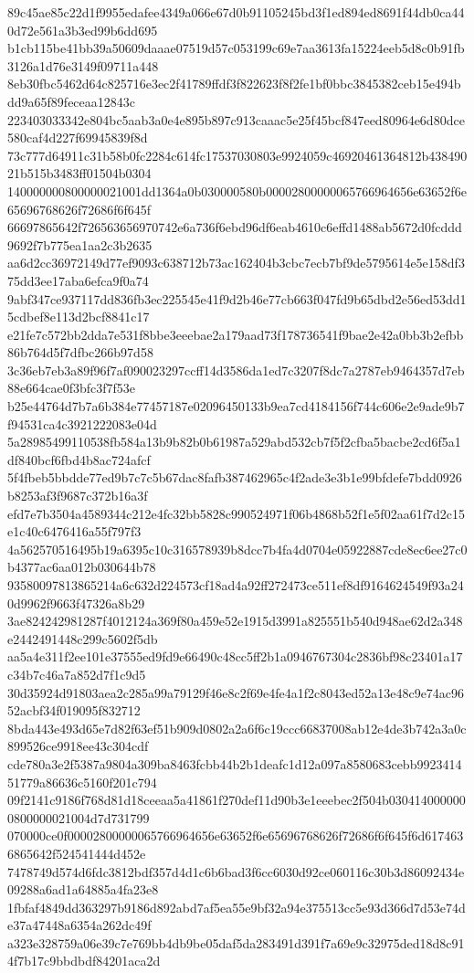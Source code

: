 {89c45ae85c22d1f9955edafee4349a066e67d0b91105245bd3f1ed894ed8691f44db0ca440d72e561a3b3ed99b6dd695
b1cb115be41bb39a50609daaae07519d57c053199c69e7aa3613fa15224eeb5d8c0b91fb3126a1d76e3149f09711a448
8eb30fbc5462d64c825716e3ec2f41789ffdf3f822623f8f2fe1bf0bbc3845382ceb15e494bdd9a65f89feceaa12843c
223403033342e804bc5aab3a0e4e895b897c913caaac5e25f45bcf847eed80964e6d80dce580caf4d227f69945839f8d
73c777d64911c31b58b0fc2284c614fc17537030803e9924059c46920461364812b43849021b515b3483ff01504b0304
140000000800000021001dd1364a0b030000580b00002800000065766964656e63652f6e65696768626f72686f6f645f
66697865642f726563656970742e6a736f6ebd96df6eab4610c6effd1488ab5672d0fcddd9692f7b775ea1aa2c3b2635
aa6d2cc36972149d77ef9093c638712b73ac162404b3cbc7ecb7bf9de5795614e5e158df375dd3ee17aba6efca9f0a74
9abf347ce937117dd836fb3ec225545e41f9d2b46e77cb663f047fd9b65dbd2e56ed53dd15cdbef8e113d2bcf8841c17
e21fe7c572bb2dda7e531f8bbe3eeebae2a179aad73f178736541f9bae2e42a0bb3b2efbb86b764d5f7dfbc266b97d58
3c36eb7eb3a89f96f7af090023297ccff14d3586da1ed7c3207f8dc7a2787eb9464357d7eb88e664cae0f3bfc3f7f53e
b25e44764d7b7a6b384e77457187e02096450133b9ea7cd4184156f744c606e2e9ade9b7f94531ca4c3921222083e04d
5a28985499110538fb584a13b9b82b0b61987a529abd532cb7f5f2cfba5bacbe2cd6f5a1df840bcf6fbd4b8ac724afcf
5f4fbeb5bbdde77ed9b7c7c5b67dac8fafb387462965c4f2ade3e3b1e99bfdefe7bdd0926b8253af3f9687c372b16a3f
efd7e7b3504a4589344c212e4fc32bb5828c990524971f06b4868b52f1e5f02aa61f7d2c15e1c40c6476416a55f797f3
4a562570516495b19a6395c10c316578939b8dcc7b4fa4d0704e05922887cde8ec6ee27c0b4377ac6aa012b030644b78
93580097813865214a6c632d224573cf18ad4a92ff272473ce511ef8df9164624549f93a240d9962f9663f47326a8b29
3ae824242981287f4012124a369f80a459e52e1915d3991a825551b540d948ae62d2a348e2442491448c299c5602f5db
aa5a4e311f2ee101e37555ed9fd9e66490c48cc5ff2b1a0946767304c2836bf98c23401a17c34b7c46a7a852d7f1c9d5
30d35924d91803aea2c285a99a79129f46e8c2f69e4fe4a1f2c8043ed52a13e48c9e74ac9652acbf34f019095f832712
8bda443e493d65e7d82f63ef51b909d0802a2a6f6c19ccc66837008ab12e4de3b742a3a0c899526ce9918ee43c304cdf
cde780a3e2f5387a9804a309ba8463fcbb44b2b1deafc1d12a097a8580683cebb992341451779a86636c5160f201c794
09f2141c9186f768d81d18ceeaa5a41861f270def11d90b3e1eeebec2f504b0304140000000800000021004d7d731799
070000ce0f00002800000065766964656e63652f6e65696768626f72686f6f645f6d6174636865642f524541444d452e
7478749d574d6fdc3812bdf357d4d1c6b6bad3f6cc6030d92ce060116c30b3d86092434e09288a6ad1a64885a4fa23e8
1fbfaf4849dd363297b9186d892abd7af5ea55e9bf32a94e375513cc5e93d366d7d53e74de37a47448a6354a262dc49f
a323e328759a06e39c7e769bb4db9be05daf5da283491d391f7a69e9c32975ded18d8c914f7b17c9bbdbdf84201aca2d
}
